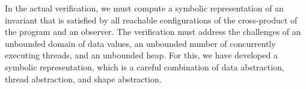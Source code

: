 In the actual verification, we must compute a symbolic representation
of an invariant that is satisfied by all reachable configurations of
the cross-product of the program  and an observer.
The verification must address the challenges of an unbounded domain of
data values, an unbounded number of concurrently executing threads, and an
unbounded heap.
For this, we have developed a symbolic representation,  which
is a careful combination of
data abstraction, thread abstraction, and shape abstraction. 
